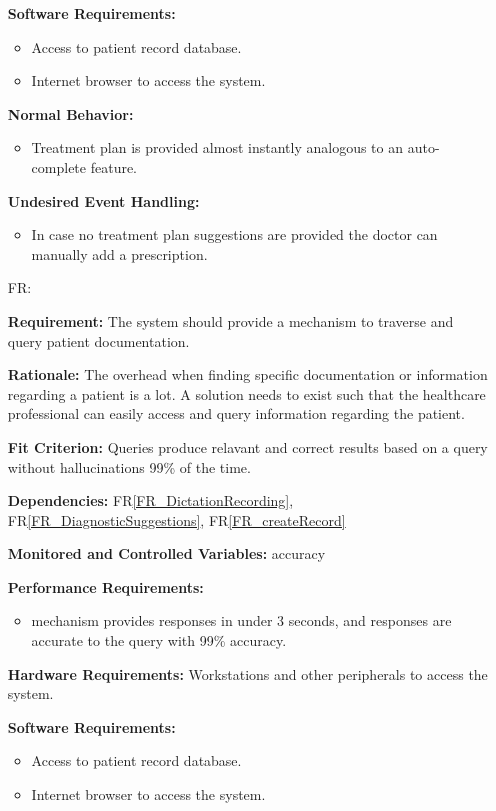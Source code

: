 \documentclass[12pt]{article}
\newcounter{reqnum} %
\begin{document}
\begin{itemize}
  \textbf{Software Requirements:}
  \begin{itemize}
    \item Access to patient record database.
    \item Internet browser to access the system. 
  \end{itemize}
  
  \textbf{Normal Behavior:}
  \begin{itemize}
    \item Treatment plan is provided almost instantly analogous to an auto-complete feature.
  \end{itemize}
  
  \textbf{Undesired Event Handling:}
  \begin{itemize}
    \item In case no treatment plan suggestions are provided the doctor can manually add a prescription.
  \end{itemize}

  \item[FR\refstepcounter{reqnum}\thereqnum \label{FR_AIAssist}:] 
  
  \textbf{Requirement:} The system should provide a mechanism to traverse and query patient documentation.
  
  \textbf{Rationale:} The overhead when finding specific documentation or information regarding a patient is a lot. A solution needs to exist such that the healthcare professional can easily access and query information regarding the patient.
  
  \textbf{Fit Criterion:} Queries produce relavant and correct results based on a query without hallucinations 99\% of the time.
   
  \textbf{Dependencies:} FR\ref{FR_DictationRecording}, FR\ref{FR_DiagnosticSuggestions}, FR\ref{FR_createRecord}
  
  \textbf{Monitored and Controlled Variables:} accuracy
  
  \textbf{Performance Requirements:}
  \begin{itemize}
    \item mechanism provides responses in under 3 seconds, and responses are accurate to the query with 99\% accuracy.
  \end{itemize}
  
  \textbf{Hardware Requirements:} 
  Workstations and other peripherals to access the system.
  
  \textbf{Software Requirements:}
  \begin{itemize}
    \item Access to patient record database.
    \item Internet browser to access the system. 
  \end{itemize}
  

\end{itemize}
\end{document}
